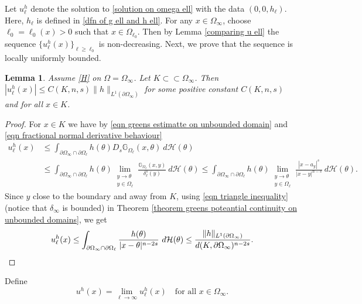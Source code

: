 \documentclass{amsart}
\newtheorem{lemma}[theorem]{Lemma}
\newcommand{\gk}[1]{\mathbb{G}_{#1}}
\newcommand{\Ds}{D_{s}}
\newcommand{\ul}{u_{\ell}}
\begin{document}
Let $u_{\ell}^{h}$ denote the solution to \eqref{solution on omega ell} with the data $(0,0,h_{\ell})$. Here, $h_{\ell}$ is defined in \eqref{dfn of g ell and h ell}. For any $x\in \Omega_{\infty}$, choose $\ell_{0}=\ell_{0}(x)>0$ such that $x\in \Omega_{\ell_{0}}$. Then by Lemma \ref{comparing u ell} the sequence $\{u^{h}_{\ell}(x)\}_{\ell\geq \ell_{0}}$ is non-decreasing.  Next, we prove that the sequence is locally uniformly bounded.
\begin{lemma}
    Assume \ref{H} on $\Omega=\Omega_{\infty}$. Let $K\subset\subset\Omega_{\infty}$. Then $|u_{\ell}^{h}(x)|\leq C(K,n,s)\|h\|_{L^{1}(\partial\Omega_{\infty})}$ for some positive constant $C(K,n,s)$ and for all $x\in K$. 
\end{lemma}
\begin{proof}
   For $x\in K$ we have by \eqref{eqn greens estimatte on unbounded domain} and \eqref{eqn fractional normal derivative behaviour}
   \begin{equation*}
   \begin{split}
      u^{h}_{\ell}(x)&\leq \int_{\partial\Omega_{\infty}\cap \partial\Omega_{\ell}}h(\theta) \Ds \gk{\Omega_{\ell}}(x,\theta)\ d\mathcal{H}(\theta) \\
      & \leq \int_{\partial\Omega_{\infty}\cap\partial\Omega_{\ell}}h(\theta)\lim_{\substack{y\to\theta \\ y\in\Omega_{\ell}}}\frac{\gk{\Omega_{\ell}}(x,y)}{\delta_{\ell}^{s}(y)}\ d\mathcal{H}(\theta)
      \leq \int_{\partial\Omega_{\infty}\cap\partial\Omega_{\ell}}h(\theta)\lim_{\substack{y\to\theta \\ y\in\Omega_{\ell}}}\frac{|x-a_y|^{s}}{|x-y|^{n-s}}\ d\mathcal{H}(\theta).
   \end{split}
 \end{equation*}
 Since $y$ close to the boundary and away from $K$, using \eqref{eqn triangle inequality} (notice that $\delta_{\infty}$ is bounded) in Theorem \ref{theorem greens poteantial continuity on unbounded domains}, we get 
 \begin{equation*}
     u^{h}_{\ell}(x) \leq \int_{\partial\Omega_{\infty}\cap\partial\Omega_{\ell}}\frac{h(\theta)}{|x-\theta|^{n-2s}}\ d\mathcal{H}(\theta)\leq \frac{\|h\|_{L^{1}(\partial\Omega_{\infty})}}{d(K,\partial\Omega_{\infty})^{n-2s}}.
     \qedhere
 \end{equation*}
\end{proof}
Define
\begin{equation}\label{dfn of uh in linear case}
    u^{h}(x)=\lim_{\ell\to\infty}\ul^{h}(x) \quad \text{for all }x\in \Omega_{\infty}.
\end{equation}
\end{document}
